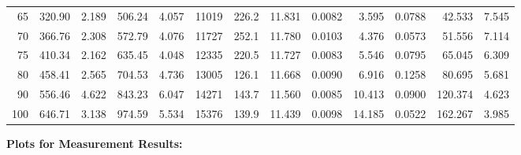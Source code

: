 \documentclass[10pt]{article}
\begin{document}
{\begin{tabular}{|r|rr|rr|rr|rr|rr|r|r|}
       65 &       320.90 &        2.189 &       506.24 &        4.057 &        11019 &        226.2 &       11.831 &       0.0082 &        3.595 &       0.0788 &       42.533 &        7.545 \\
       70 &       366.76 &        2.308 &       572.79 &        4.076 &        11727 &        252.1 &       11.780 &       0.0103 &        4.376 &       0.0573 &       51.556 &        7.114 \\
       75 &       410.34 &        2.162 &       635.45 &        4.048 &        12335 &        220.5 &       11.727 &       0.0083 &        5.546 &       0.0795 &       65.045 &        6.309 \\
       80 &       458.41 &        2.565 &       704.53 &        4.736 &        13005 &        126.1 &       11.668 &       0.0090 &        6.916 &       0.1258 &       80.695 &        5.681 \\
       90 &       556.46 &        4.622 &       843.23 &        6.047 &        14271 &        143.7 &       11.560 &       0.0085 &       10.413 &       0.0900 &      120.374 &        4.623 \\
      100 &       646.71 &        3.138 &       974.59 &        5.534 &        15376 &        139.9 &       11.439 &       0.0098 &       14.185 &       0.0522 &      162.267 &        3.985 \\
\hline
\end{tabular}
}

\vspace{3mm}






\pagebreak
\noindent
{\large \bf Plots for Measurement Results:}
\vspace{5mm}
\end{document}
